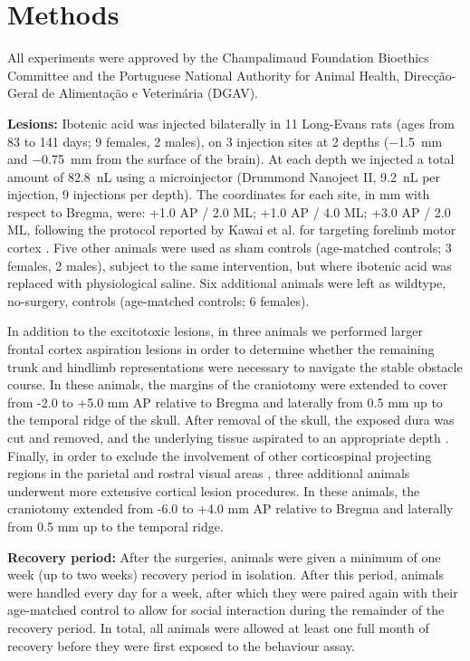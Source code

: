 \section{Methods}

All experiments were approved by the Champalimaud Foundation Bioethics Committee and the Portuguese National Authority for Animal Health, Direcção-Geral de Alimentação e Veterinária (DGAV).

\textbf{Lesions:} Ibotenic acid was injected bilaterally in 11 Long-Evans rats (ages from 83 to 141 days; 9 females, 2 males), on 3 injection sites at 2 depths (\SI{-1.5}{\milli\meter} and \SI{-0.75}{\milli\meter} from the surface of the brain). At each depth we injected a total amount of \SI{82.8}{\nano\liter} using a microinjector (Drummond Nanoject II, \SI{9.2}{\nano\liter} per injection, 9 injections per depth). The coordinates for each site, in \si{\milli\meter} with respect to Bregma, were: +1.0 AP / 2.0 ML; +1.0 AP / 4.0 ML; +3.0 AP / 2.0 ML, following the protocol reported by Kawai et al. for targeting forelimb motor cortex \cite{Kawai2015}. Five other animals were used as sham controls (age-matched controls; 3 females, 2 males), subject to the same intervention, but where ibotenic acid was replaced with physiological saline. Six additional animals were left as wildtype, no-surgery, controls (age-matched controls; 6 females).

In addition to the excitotoxic lesions, in three animals we performed larger frontal cortex aspiration lesions in order to determine whether the remaining trunk and hindlimb representations were necessary to navigate the stable obstacle course. In these animals, the margins of the craniotomy were extended to cover from -2.0 to +5.0 \si{\milli\meter} AP relative to Bregma and laterally from 0.5 \si{\milli\meter} up to the temporal ridge of the skull. After removal of the skull, the exposed dura was cut and removed, and the underlying tissue aspirated to an appropriate depth \cite{Whishaw2000}. Finally, in order to exclude the involvement of other corticospinal projecting regions in the parietal and rostral visual areas \cite{Miller1987}, three additional animals underwent more extensive cortical lesion procedures. In these animals, the craniotomy extended from -6.0 to +4.0 \si{\milli\meter} AP relative to Bregma and laterally from 0.5 \si{\milli\meter} up to the temporal ridge.

\textbf{Recovery period:} After the surgeries, animals were given a minimum of one week (up to two weeks) recovery period in isolation. After this period, animals were handled every day for a week, after which they were paired again with their age-matched control to allow for social interaction during the remainder of the recovery period. In total, all animals were allowed at least one full month of recovery before they were first exposed to the behaviour assay.

